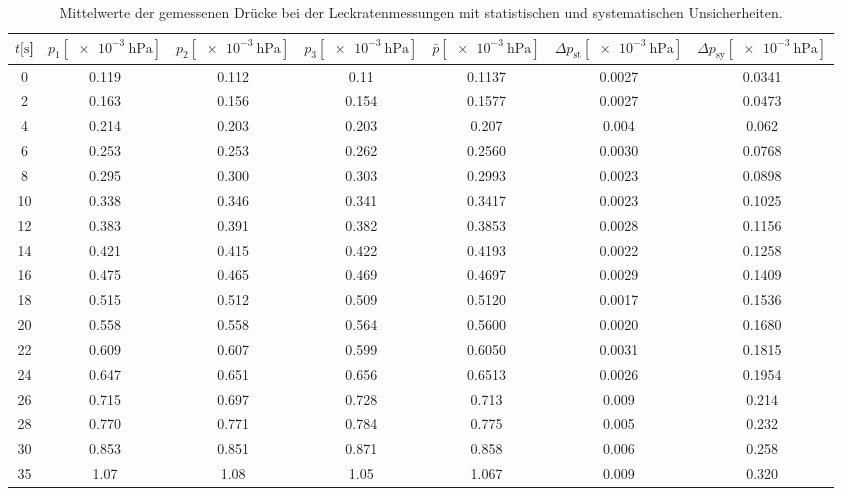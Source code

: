 \begin{table}[H]
  \centering
    \caption{Mittelwerte der gemessenen Drücke bei der Leckratenmessungen mit statistischen und systematischen Unsicherheiten.}
    \label{tab:Turbo_Leck3}
    \small{
    \begin{tabular}{
      S[table-format=3.0] 
      S[table-format=1.3] S[table-format=1.3] S[table-format=1.3]
      S[table-format=1.4] S[table-format=1.4] S[table-format=1.3]
      }
      \toprule
      {$t [\si{\second}$]} &
      {$p_1 [\SI{e-3}{\hecto\pascal}]$} & {$p_2 [\SI{e-3}{\hecto\pascal}]$} & {$p_3 [\SI{e-3}{\hecto\pascal}]$} &
      {$\bar{p} [\SI{e-3}{\hecto\pascal}]$} & {$\Delta p_\text{st} [\SI{e-3}{\hecto\pascal}]$} & {$\Delta p_\text{sy} [\SI{e-3}{\hecto\pascal}]$}\\
           & 0.119 & 0.112 & 0.11  & 0.1137 & 0.0027 & 0.0341 \\
      2     & 0.163 & 0.156 & 0.154 & 0.1577 & 0.0027 & 0.0473 \\
      4     & 0.214 & 0.203 & 0.203 & 0.207  & 0.004  & 0.062  \\
      6     & 0.253 & 0.253 & 0.262 & 0.2560 & 0.0030 & 0.0768 \\
      8     & 0.295 & 0.300 & 0.303 & 0.2993 & 0.0023 & 0.0898 \\
      10    & 0.338 & 0.346 & 0.341 & 0.3417 & 0.0023 & 0.1025 \\
      12    & 0.383 & 0.391 & 0.382 & 0.3853 & 0.0028 & 0.1156 \\
      14    & 0.421 & 0.415 & 0.422 & 0.4193 & 0.0022 & 0.1258 \\
      16    & 0.475 & 0.465 & 0.469 & 0.4697 & 0.0029 & 0.1409 \\
      18    & 0.515 & 0.512 & 0.509 & 0.5120 & 0.0017 & 0.1536 \\
      20    & 0.558 & 0.558 & 0.564 & 0.5600 & 0.0020 & 0.1680 \\
      22    & 0.609 & 0.607 & 0.599 & 0.6050 & 0.0031 & 0.1815 \\
      24    & 0.647 & 0.651 & 0.656 & 0.6513 & 0.0026 & 0.1954 \\
      26    & 0.715 & 0.697 & 0.728 & 0.713  & 0.009  & 0.214  \\
      28    & 0.770 & 0.771 & 0.784 & 0.775  & 0.005  & 0.232  \\
      30    & 0.853 & 0.851 & 0.871 & 0.858  & 0.006  & 0.258  \\
      35    & 1.07  & 1.08  & 1.05  & 1.067  & 0.009  & 0.320  \\

\end{tabular}}
\end{table}
